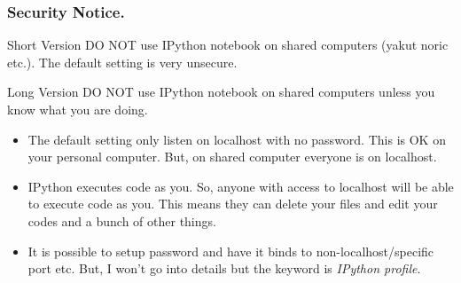 \documentclass{beamer}
\begin{document}
\frame
{
	\frametitle{Security Notice.}
	\begin{block}{Short Version}
		{\color{red}DO NOT} use IPython notebook on shared computers (yakut noric etc.). The default setting is very unsecure.
	\end{block}
	\begin{block}{Long Version}
		{\color{red}DO NOT} use IPython notebook on shared computers unless you know what you are doing.
		\begin{itemize}
			\item The default setting only listen on localhost with no password. This is OK on your personal computer. But, on shared computer everyone is on localhost.
			\item IPython executes code as you. So, anyone with access to localhost will be able
			      to execute code as you. This means they can delete your files and edit your codes and a bunch of other things.
			\item It is possible to setup password and have it binds to non-localhost/specific port etc. But, I won't go into details but the keyword is \emph{IPython profile}.
		\end{itemize}
	\end{block}
}
\end{document}
